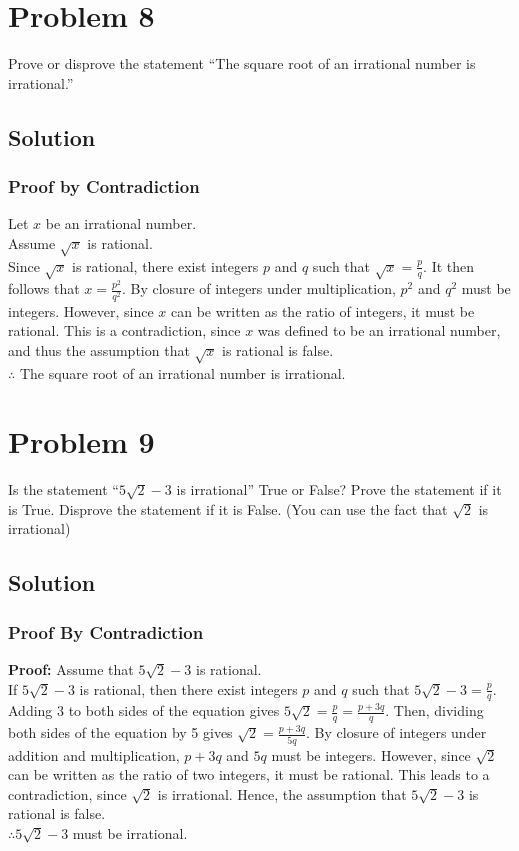 \documentclass[table]{article}
\begin{document}
\section{Problem 8}
Prove or disprove the statement ``The square root of an irrational number is irrational.''
\subsection{Solution}
\subsubsection{Proof by Contradiction}
Let $x$ be an irrational number.\\
Assume $\sqrt{x}$ is rational.\\
Since $\sqrt{x}$ is rational, there exist integers $p$ and $q$ such that $\sqrt{x}=\frac{p}{q}$. It then follows that $x=\frac{p^2}{q^2}$. By closure of integers under multiplication, $p^2$ and $q^2$ must be integers. However, since $x$ can be written as the ratio of integers, it must be rational. This is a contradiction, since $x$ was defined to be an irrational number, and thus the assumption that $\sqrt{x}$ is rational is false.\\
$\therefore$ The square root of an irrational number is irrational.
\section{Problem 9}
Is the statement ``$5\sqrt{2} - 3$ is irrational'' True or False? Prove the statement if it is True.
Disprove the statement if it is False. (You can use the fact that $\sqrt{2}$ is irrational)
\subsection{Solution}
\subsubsection{Proof By Contradiction}
\textbf{Proof:} Assume that $5\sqrt{2} - 3$ is rational.\\
If $5\sqrt{2} - 3$ is rational, then there exist integers $p$ and $q$ such that $5\sqrt{2} - 3 = \frac{p}{q}$. Adding $3$ to both sides of the equation gives $5\sqrt{2} = \frac{p}{q} = \frac{p+3q}{q}$. Then, dividing both sides of the equation by 5 gives $\sqrt{2} = \frac{p+3q}{5q}$. By closure of integers under addition and multiplication, $p+3q$ and $5q$ must be integers. However, since $\sqrt{2}$ can be written as the ratio of two integers, it must be rational. This leads to a contradiction, since $\sqrt{2}$ is irrational. Hence, the assumption that $5\sqrt{2} - 3$ is rational is false.\\
$\therefore 5\sqrt{2} - 3$ must be irrational.
\end{document}
